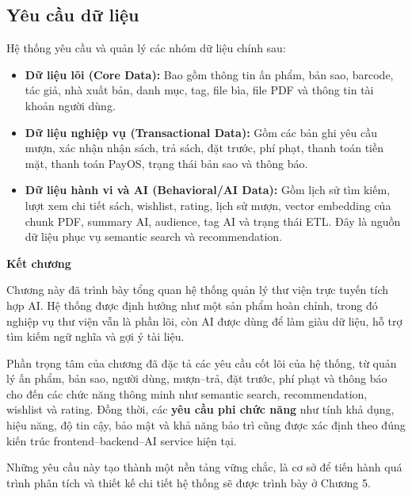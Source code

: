 \subsection{Yêu cầu dữ liệu}
\label{subsec:YeuCauDuLieu}
Hệ thống yêu cầu và quản lý các nhóm dữ liệu chính sau:
\begin{itemize}
    \item \textbf{Dữ liệu lõi (Core Data):} Bao gồm thông tin ấn phẩm, bản sao, barcode, tác giả, nhà xuất bản, danh mục, tag, file bìa, file PDF và thông tin tài khoản người dùng.

    \item \textbf{Dữ liệu nghiệp vụ (Transactional Data):} Gồm các bản ghi yêu cầu mượn, xác nhận nhận sách, trả sách, đặt trước, phí phạt, thanh toán tiền mặt, thanh toán PayOS, trạng thái bản sao và thông báo.

    \item \textbf{Dữ liệu hành vi và AI (Behavioral/AI Data):} Gồm lịch sử tìm kiếm, lượt xem chi tiết sách, wishlist, rating, lịch sử mượn, vector embedding của chunk PDF, summary AI, audience, tag AI và trạng thái ETL. Đây là nguồn dữ liệu phục vụ semantic search và recommendation.
\end{itemize}

\textbf{Kết chương}

Chương này đã trình bày tổng quan hệ thống quản lý thư viện trực tuyến tích hợp AI. Hệ thống được định hướng như một sản phẩm hoàn chỉnh, trong đó nghiệp vụ thư viện vẫn là phần lõi, còn AI được dùng để làm giàu dữ liệu, hỗ trợ tìm kiếm ngữ nghĩa và gợi ý tài liệu.

Phần trọng tâm của chương đã đặc tả các yêu cầu cốt lõi của hệ thống, từ quản lý ấn phẩm, bản sao, người dùng, mượn--trả, đặt trước, phí phạt và thông báo cho đến các chức năng thông minh như semantic search, recommendation, wishlist và rating. Đồng thời, các \textbf{yêu cầu phi chức năng} như tính khả dụng, hiệu năng, độ tin cậy, bảo mật và khả năng bảo trì cũng được xác định theo đúng kiến trúc frontend--backend--AI service hiện tại.

Những yêu cầu này tạo thành một nền tảng vững chắc, là cơ sở để tiến hành quá trình phân tích và thiết kế chi tiết hệ thống sẽ được trình bày ở Chương 5.

